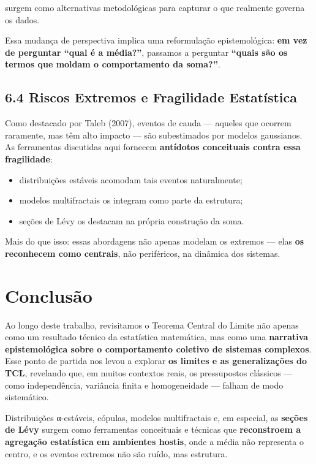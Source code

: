 \documentclass[
  portuguese,
]{agujournal2019}
\providecommand{\tightlist}{%
  \setlength{\itemsep}{0pt}\setlength{\parskip}{0pt}}
\begin{document}
surgem como alternativas metodológicas para capturar o que realmente
governa os dados.

Essa mudança de perspectiva implica uma reformulação epistemológica:
\textbf{em vez de perguntar ``qual é a média?''}, passamos a perguntar
\textbf{``quais são os termos que moldam o comportamento da soma?''}.

\subsection{6.4 Riscos Extremos e Fragilidade
Estatística}\label{riscos-extremos-e-fragilidade-estatuxedstica}

Como destacado por Taleb (2007), eventos de cauda --- aqueles que
ocorrem raramente, mas têm alto impacto --- são subestimados por modelos
gaussianos. As ferramentas discutidas aqui fornecem \textbf{antídotos
conceituais contra essa fragilidade}:

\begin{itemize}
\tightlist
\item
  distribuições estáveis acomodam tais eventos naturalmente;
\item
  modelos multifractais os integram como parte da estrutura;
\item
  seções de Lévy os destacam na própria construção da soma.
\end{itemize}

Mais do que isso: essas abordagens não apenas modelam os extremos ---
elas \textbf{os reconhecem como centrais}, não periféricos, na dinâmica
dos sistemas.

\section{Conclusão}\label{conclusuxe3o}

Ao longo deste trabalho, revisitamos o Teorema Central do Limite não
apenas como um resultado técnico da estatística matemática, mas como uma
\textbf{narrativa epistemológica sobre o comportamento coletivo de
sistemas complexos}. Esse ponto de partida nos levou a explorar
\textbf{os limites e as generalizações do TCL}, revelando que, em muitos
contextos reais, os pressupostos clássicos --- como independência,
variância finita e homogeneidade --- falham de modo sistemático.

Distribuições α-estáveis, cópulas, modelos multifractais e, em especial,
as \textbf{seções de Lévy} surgem como ferramentas conceituais e
técnicas que \textbf{reconstroem a agregação estatística em ambientes
hostis}, onde a média não representa o centro, e os eventos extremos não
são ruído, mas estrutura.
\end{document}

